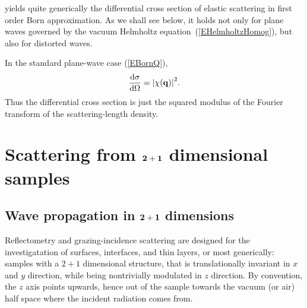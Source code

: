 yields quite generically the differential cross section of elastic scattering
in first order Born approximation.
As we shall see below,
it holds not only for plane waves governed
by the vacuum Helmholtz equation~(\ref{EHelmholtzHomog}),
but also for distorted waves.

In the standard plane-wave case (\ref{EBornQ}),
\begin{equation}\label{Ecross1}
  \frac{{\rm d}\sigma}{{\rm d}\Omega}
  = {\left| \chi(\mathbf{q}) \right|}^2.
\end{equation}
Thus the differential cross section is just the squared modulus
of the Fourier transform 
of the scattering-length density.


\section{Scattering from $\mathbf{2+1}$ dimensional samples}\label{Sdwba}

\subsection{Wave propagation in $\mathbf{2+1}$ dimensions}

Reflectometry and grazing-incidence scattering
are designed for the investigatation of surfaces, interfaces, and thin layers,
or most generically:
samples with a $2+1$ dimensional structure,
that is translationally invariant in $x$ and $y$ direction,
while being nontrivially modulated in $z$ direction.
By convention,
the $z$ axis points upwards, hence out of the sample towards the
vacuum (or air) half space where the incident radiation comes from.

